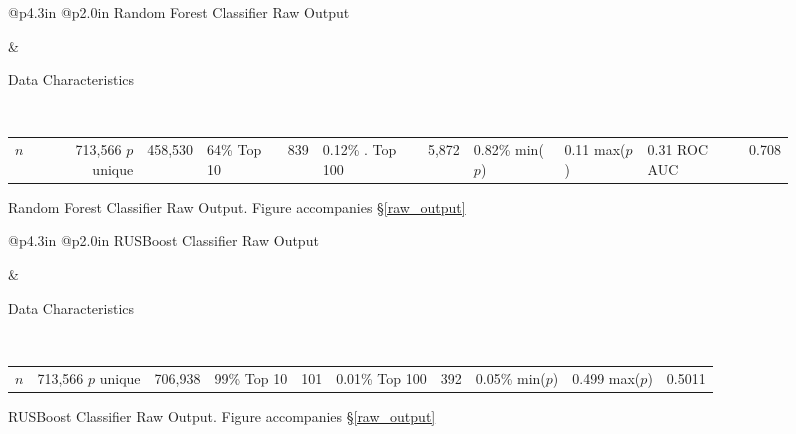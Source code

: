 \begin{figure}[h]
\noindent\begin{tabular}{@{\hspace{-6pt}}p{4.3in} @{\hspace{-6pt}}p{2.0in}}
	\vskip 0pt
	\hfil {\normalfont\normalsize Random Forest Classifier Raw Output}
	
		
&
	\normalfont\normalsize 
	\vskip 0pt
	
	Data Characteristics
	
	\
	
	\begin{tabular}{rrr}
		$n$ & 713,566 \cr
		$p$ unique & 458,530 & 64\% \cr
		Top 10 & 839 & 0.12\% \cr.
		Top 100 & 5,872 & 0.82\% \cr
		min($p$) & 0.11 \cr
		max($p$) & 0.31 \cr
		ROC AUC & 0.708 \cr
	\end{tabular}
\cr
\end{tabular}

\caption{\normalfont\normalsize Random Forest Classifier Raw Output.  Figure accompanies \S\ref{raw_output}}
\label{RFC_raw}
\end{figure}


\begin{figure}[h]
\noindent\begin{tabular}{@{\hspace{-6pt}}p{4.3in} @{\hspace{-6pt}}p{2.0in}}
	\vskip 0pt
	\hfil {\normalfont\normalsize RUSBoost Classifier Raw Output}
	
		
&
	\normalfont\normalsize 
	\vskip 0pt
	
	Data Characteristics
	
	\
	
	\begin{tabular}{rrr}
		$n$ & 713,566 \cr
		$p$ unique & 706,938 & 99\% \cr
		Top 10 & 101 & 0.01\% \cr
		Top 100 & 392 & 0.05\% \cr
		min($p$) & 0.499 \cr
		max($p$) & 0.5011 \cr
	\end{tabular}
\cr
\end{tabular}

\caption{\normalfont\normalsize RUSBoost Classifier Raw Output.  Figure accompanies \S\ref{raw_output}}
\label{RUSBoost_raw}
\end{figure}
